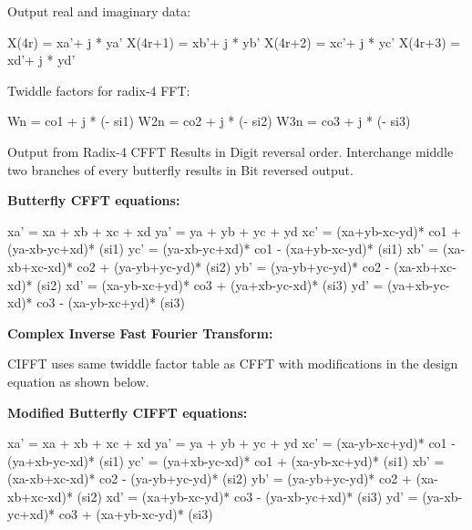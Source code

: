 \begin{DoxyParagraph}{}
Output real and imaginary data\-: 
\begin{DoxyPre}   
 X(4r) = xa'+ j * ya'   
 X(4r+1) = xb'+ j * yb'   
 X(4r+2) = xc'+ j * yc'   
 X(4r+3) = xd'+ j * yd'   
 \end{DoxyPre}
 
\end{DoxyParagraph}
\begin{DoxyParagraph}{}
Twiddle factors for radix-\/4 F\-F\-T\-: 
\begin{DoxyPre}   
 Wn = co1 + j * (- si1)   
 W2n = co2 + j * (- si2)   
 W3n = co3 + j * (- si3)   
 \end{DoxyPre}

\end{DoxyParagraph}
\begin{DoxyParagraph}{}

\end{DoxyParagraph}
\begin{DoxyParagraph}{}
Output from Radix-\/4 C\-F\-F\-T Results in Digit reversal order. Interchange middle two branches of every butterfly results in Bit reversed output. 
\end{DoxyParagraph}
\begin{DoxyParagraph}{}
{\bfseries  Butterfly C\-F\-F\-T equations\-:} 
\begin{DoxyPre}   
 xa' = xa + xb + xc + xd   
 ya' = ya + yb + yc + yd   
 xc' = (xa+yb-xc-yd)* co1 + (ya-xb-yc+xd)* (si1)   
 yc' = (ya-xb-yc+xd)* co1 - (xa+yb-xc-yd)* (si1)   
 xb' = (xa-xb+xc-xd)* co2 + (ya-yb+yc-yd)* (si2)   
 yb' = (ya-yb+yc-yd)* co2 - (xa-xb+xc-xd)* (si2)   
 xd' = (xa-yb-xc+yd)* co3 + (ya+xb-yc-xd)* (si3)   
 yd' = (ya+xb-yc-xd)* co3 - (xa-yb-xc+yd)* (si3)   
 \end{DoxyPre}

\end{DoxyParagraph}
{\bfseries Complex Inverse Fast Fourier Transform\-:} \begin{DoxyParagraph}{}
C\-I\-F\-F\-T uses same twiddle factor table as C\-F\-F\-T with modifications in the design equation as shown below.
\end{DoxyParagraph}
\begin{DoxyParagraph}{}
{\bfseries  Modified Butterfly C\-I\-F\-F\-T equations\-:} 
\begin{DoxyPre}   
 xa' = xa + xb + xc + xd   
 ya' = ya + yb + yc + yd   
 xc' = (xa-yb-xc+yd)* co1 - (ya+xb-yc-xd)* (si1)   
 yc' = (ya+xb-yc-xd)* co1 + (xa-yb-xc+yd)* (si1)   
 xb' = (xa-xb+xc-xd)* co2 - (ya-yb+yc-yd)* (si2)   
 yb' = (ya-yb+yc-yd)* co2 + (xa-xb+xc-xd)* (si2)   
 xd' = (xa+yb-xc-yd)* co3 - (ya-xb-yc+xd)* (si3)   
 yd' = (ya-xb-yc+xd)* co3 + (xa+yb-xc-yd)* (si3)   
 \end{DoxyPre}

\end{DoxyParagraph}

